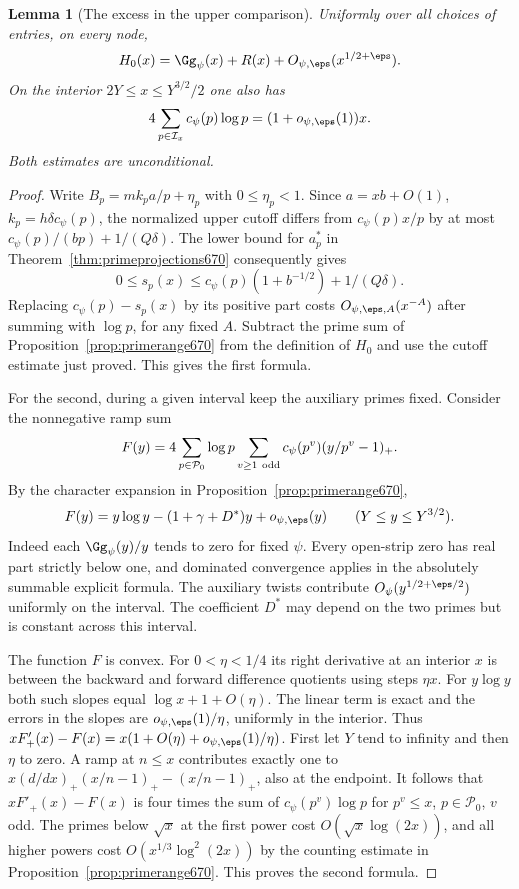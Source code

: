 \documentclass[a4paper,11pt]{article}
\newtheorem{lemma}[proposition]{Lemma}
\theoremstyle{definition}
\theoremstyle{remark}
\numberwithin{equation}{section}
\begin{document}
\begin{lemma}[The excess in the upper comparison]
\leavevmode\label{lem:excessmass671}
Uniformly over all choices of entries, on every node,
\[
             H_0(x)=\Gg_\psi(x)+R(x)+O_{\psi,\eps}(x^{1/2+\eps}).
\]
On the interior \(2Y\le x\le Y^{3/2}/2\) one also has
\[
          4\sum_{p\in\mathcal I_x}c_\psi(p)\log p
                            =(1+o_{\psi,\eps}(1))x .
\]
Both estimates are unconditional.
\end{lemma}
\begin{proof}
Write \(B_p=m k_p a/p+\eta_p\) with \(0\le\eta_p<1\).
Since \(a=xb+O(1)\), \(k_p=h\delta c_\psi(p)\), the normalized
upper cutoff differs from \(c_\psi(p)x/p\) by at most
\(c_\psi(p)/(bp)+1/(Q\delta)\). The lower bound for \(a_p^*\)
in Theorem~\ref{thm:primeprojections670} consequently gives
\[
 0\le s_p(x)\le c_\psi(p)(1+b^{-1/2})+1/(Q\delta).
\]
Replacing \(c_\psi(p)-s_p(x)\) by its positive part costs
\(O_{\psi,\eps,A}(x^{-A})\) after summing with \(\log p\), for
any fixed \(A\). Subtract the prime sum of
Proposition~\ref{prop:primerange670} from the definition of
\(H_0\) and use the cutoff estimate just proved. This gives the
first formula.

For the second, during a given interval keep the auxiliary
primes fixed. Consider the nonnegative ramp sum
\[
 F(y)=4\sum_{p\in\mathcal P_0}\log p
       \sum_{v\ge1\ {\rm odd}}c_\psi(p^v)(y/p^v-1)_+ .
\]
By the character expansion in Proposition~\ref{prop:primerange670},
\[
 F(y)=y\log y-(1+\gamma+D^*)y+o_{\psi,\eps}(y)
                          \qquad(Y\le y\le Y^{3/2}).
\]
Indeed each \(\Gg_\psi(y)/y\) tends to zero for fixed \(\psi\). Every open-strip zero has real part strictly
below one, and dominated convergence applies in the absolutely
summable explicit formula. The auxiliary twists contribute \(O_\psi(y^{1/2+\eps/2})\)
uniformly on the interval. The coefficient \(D^*\) may depend
on the two primes but is constant across this interval.

The function \(F\) is convex. For \(0<\eta<1/4\) its right
derivative at an interior \(x\) is between the backward and
forward difference quotients using steps \(\eta x\).
For \(y\log y\) both such slopes equal \(\log x+1+O(\eta)\).
The linear term is exact and the errors in the slopes are
\(o_{\psi,\eps}(1)/\eta\), uniformly in the interior. Thus
\(xF'_+(x)-F(x)=x(1+O(\eta)+o_{\psi,\eps}(1)/\eta)\).
First let \(Y\) tend to infinity and then \(\eta\) to zero.
A ramp at \(n\le x\) contributes exactly one to
\(x(d/dx)_+(x/n-1)_+-(x/n-1)_+\), also at the endpoint.
It follows that \(xF'_+(x)-F(x)\) is four times the sum of
\(c_\psi(p^v)\log p\) for \(p^v\le x\), \(p\in\mathcal P_0\),
\(v\) odd. The primes below \(\sqrt x\) at the first power cost
\(O(\sqrt x\log(2x))\), and all higher powers cost
\(O(x^{1/3}\log^2(2x))\) by the counting estimate in
Proposition~\ref{prop:primerange670}. This proves the second formula.
\end{proof}
\end{document}
